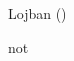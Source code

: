 \documentclass[a4paper,11pt]{article}
\title{}
\author{}
\date{}
\begin{document}
\maketitle

Lojban (\jobname)

not 
\end{document}
